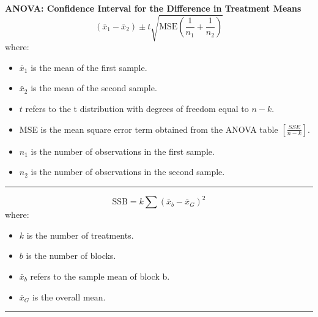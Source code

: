 \documentclass[	DIV=calc,%
							paper=a4,%
							fontsize=11pt,%
							twocolumn]{scrartcl} %
\newcommand{\hformbar}[1]{\vspace{5pt}\hrule\vspace{10pt}} %
\newcommand{\formdesc}[1]{\noindent\textbf{#1}}
\begin{document}
\formdesc{ANOVA: Confidence Interval for the Difference in Treatment Means}
\begin{equation}
\label{confidence interval for the difference in treatment means}
(\bar{x}_{1} - \bar{x}_{2}) \pm t\sqrt{\text{MSE}\left(\frac{1}{n_{1}} + \frac{1}{n_{2}}\right)}
\end{equation}
where:
\begin{itemize}
 \item $\bar{x}_{1}$ is the mean of the first sample.
 \item $\bar{x}_{2}$ is the mean of the second sample.
 \item $t$ refers to the t distribution with degrees of freedom equal to $n-k$. 
 \item MSE is the mean square error term obtained from the ANOVA table $\left[\frac{SSE}{n-k}\right]$.
 \item $n_{1}$ is the number of observations in the first sample.
 \item $n_{2}$ is the number of observations in the second sample.
\end{itemize}
\hformbar


\formdesc{ANOVA: Two-Way -- Sum of Squares Blocks}
\begin{equation}
\label{sum of squares blocks}
\text{SSB} = k\sum(\bar{x}_{b}-\bar{x}_{G})^{2}
\end{equation}
where:
\begin{itemize}
 \item $k$ is the number of treatments.
 \item $b$ is the number of blocks.
 \item $\bar{x}_{b}$ refers to the sample mean of block b.
 \item $\bar{x}_{G}$ is the overall mean.
\end{itemize}
\hformbar

\newpage
\cleardoublepage
\end{document}
